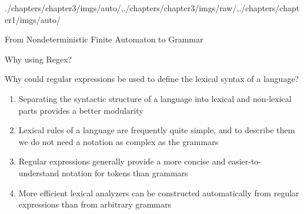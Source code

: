 \begin{graphicspathcontext}{{./chapters/chapter3/imgs/auto/},{./chapters/chapter3/imgs/raw/},{./chapters/chapter1/imgs/auto/}}
\begin{bibunit}[apalike]
\begin{frame}[t]{From Nondeterministic Finite Automaton to Grammar}
	\begin{footnotesize}
	\begin{myalgorithm}
	\end{myalgorithm}
	\end{footnotesize}
\end{frame}

\begin{frame}[t]{Why using Regex?}
	\begin{alertblock}{Why could regular expressions be used to define the lexical syntax of a language?}
		\begin{enumerate}
			\item Separating the syntactic structure of a language into lexical and non-lexical parts provides a better modularity
			\item Lexical rules of a language are frequently quite simple, and to describe them we do not need a notation as complex as the grammars
			\item Regular expressions generally provide a more concise and easier-to-understand notation for tokens than grammars
			\item More efficient lexical analyzers can be constructed automatically from regular expressions than from arbitrary grammars
		\end{enumerate}
	\end{alertblock}
	\hfill
\end{frame}


\end{bibunit}
\end{graphicspathcontext}
